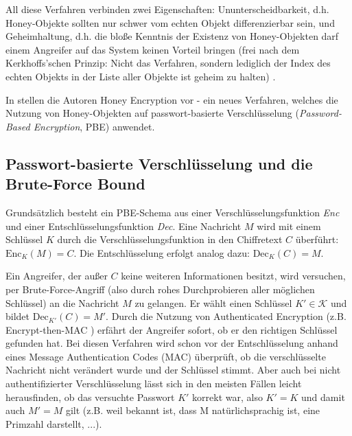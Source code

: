 All diese Verfahren verbinden zwei Eigenschaften: Ununterscheidbarkeit, d.h. Honey-Objekte sollten nur schwer vom echten Objekt differenzierbar sein, und Geheimhaltung, d.h. die bloße Kenntnis der Existenz von Honey-Objekten darf einem Angreifer auf das System keinen Vorteil bringen (frei nach dem Kerkhoffs'schen Prinzip: Nicht das Verfahren, sondern lediglich der Index des echten Objekts in der Liste aller Objekte ist geheim zu halten) \cite{SACMAT2014}.

In \cite{EURO2014} stellen die Autoren Honey Encryption vor - ein neues Verfahren, welches die Nutzung von Honey-Objekten auf passwort-basierte Verschlüsselung (\textit{Password-Based Encryption}, PBE) anwendet.

\subsection{Passwort-basierte Verschlüsselung und die Brute-Force Bound}

Grundsätzlich besteht ein PBE-Schema aus einer Verschlüsselungsfunktion \textit{Enc} und einer Entschlüsselungsfunktion \textit{Dec}. Eine Nachricht \(M\) wird mit einem Schlüssel \(K\) durch die Verschlüsselungsfunktion in den Chiffretext \(C\) überführt: \(\text{Enc}_K(M)=C\). Die Entschlüsselung erfolgt analog dazu: \(\text{Dec}_K(C)=M\). 

Ein Angreifer, der außer \(C\) keine weiteren Informationen besitzt, wird versuchen, per Brute-Force-Angriff (also durch rohes Durchprobieren aller möglichen Schlüssel) an die Nachricht \(M\) zu gelangen. Er wählt einen Schlüssel \(K' \in \mathcal{K}\) und bildet \(\text{Dec}_{K'}(C)=M'\). Durch die Nutzung von Authenticated Encryption (z.B. Encrypt-then-MAC \cite{AE2000}) erfährt der Angreifer sofort, ob er den richtigen Schlüssel gefunden hat. Bei diesen Verfahren wird schon vor der Entschlüsselung anhand eines Message Authentication Codes (MAC) überprüft, ob die verschlüsselte Nachricht nicht verändert wurde und der Schlüssel stimmt. Aber auch bei nicht authentifizierter Verschlüsselung lässt sich in den meisten Fällen leicht herausfinden, ob das versuchte Passwort \(K'\) korrekt war, also \(K'=K\) und damit auch \(M'=M\) gilt (z.B. weil bekannt ist, dass M natürlichsprachig ist, eine Primzahl darstellt, ...). 

